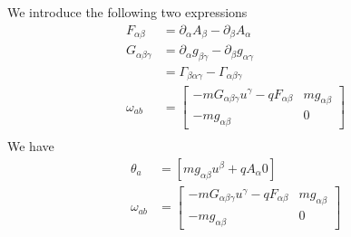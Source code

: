 We introduce the following two expressions
\begin{equation}
	\begin{aligned}
		F_{\alpha\beta} &= \partial_\alpha A_\beta - \partial_\beta A_\alpha \\
		G_{\alpha\beta\gamma} &= \partial_\alpha g_{\beta \gamma} - \partial_\beta g_{\alpha \gamma} \\
		&= \Gamma_{\beta\alpha\gamma} - \Gamma_{\alpha\beta\gamma} \\
		\omega_{ab} &= \left[ \begin{matrix}
			- m G_{\alpha\beta\gamma} u^\gamma - q F_{\alpha\beta} & mg_{\alpha \beta} \\[2.2ex]
			- mg_{\alpha \beta} & 0 \end{matrix} \right] \\
	\end{aligned}
\end{equation}
We have
\begin{equation}\label{rp-cm-rm-kinematicSymplecticForm}
	\begin{aligned}
		\theta_a &= [m g_{\alpha\beta} u^{\beta} + q A_{\alpha} 0] \\
		\omega_{ab} &= \left[ \begin{matrix}
			- m G_{\alpha\beta\gamma} u^\gamma - q F_{\alpha\beta} & mg_{\alpha \beta} \\[2.2ex]
			- mg_{\alpha \beta} & 0 \end{matrix} \right] \\
	\end{aligned}
\end{equation}

